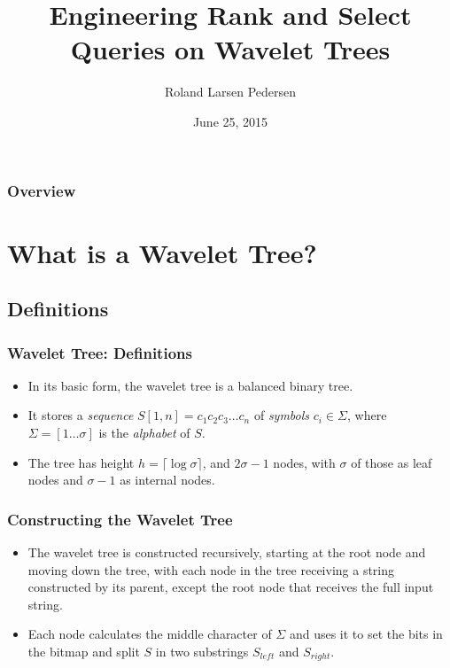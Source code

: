 \documentclass{beamer}
\title[Wavelet Tree]{Engineering Rank and Select Queries on Wavelet Trees} %
\author{Roland Larsen Pedersen} %
\institute[Datalogi] %
{
Datalogi, Aarhus Universitet \\ %
\medskip
\textit{Thesis defence}
}
\date{June 25, 2015} %
\begin{document}
\begin{frame}
\titlepage %
\end{frame}

\begin{frame}
\frametitle{Overview} %
\tableofcontents %
\end{frame}



\section{What is a Wavelet Tree?}

\subsection{Definitions}
\begin{frame}
\frametitle{Wavelet Tree: Definitions}
\begin{itemize}
\item In its basic form, the wavelet tree is a balanced binary tree. 
\item It stores a \textit{sequence} $S[1,n] = c_1c_2c_3 \ldots c_n$ of \textit{symbols} $c_i \in \Sigma$, where $\Sigma = [1 \ldots \sigma]$ is the \textit{alphabet} of $S$.
\item The tree has height $h = \lceil \log \sigma \rceil$, and $2 \sigma - 1$ nodes, with $\sigma$ of those as leaf nodes and $\sigma - 1$ as internal nodes.
\end{itemize}

\end{frame}



\begin{frame}
\frametitle{Constructing the Wavelet Tree}
\begin{itemize}
\item The wavelet tree is constructed recursively, starting at the root node and moving down the tree, with each node in the tree receiving a string constructed by its parent, except the root node that receives the full input string.
\item Each node calculates the middle character of $\Sigma$ and uses it to set the bits in the bitmap and split $S$ in two substrings $S_{\mathit{left}}$ and $S_{\mathit{right}}$.
\end{itemize}
\end{frame}
\end{document}
